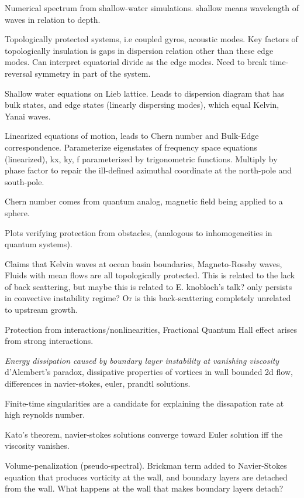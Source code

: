 \begin{description}
{\begin{description}
Numerical spectrum from shallow-water simulations. shallow means wavelength
of waves in relation to depth.

Topologically protected systems, i.e coupled gyros, acoustic modes.
Key factors of topologically insulation is gaps in dispersion relation
other than these edge modes. Can interpret equatorial divide as the edge
modes. Need to break time-reversal symmetry in part of the system.

Shallow water equations on Lieb lattice. Leads to dispersion
diagram that has bulk states, and edge states (linearly dispersing modes),
which equal Kelvin, Yanai waves.

Linearized equations of motion, leads to Chern number and Bulk-Edge correspondence.
Parameterize eigenstates of frequency space equations (linearized), kx, ky, f
parameterized by trigonometric functions. Multiply by phase factor to repair the
ill-defined azimuthal coordinate at the north-pole and south-pole.

Chern number comes from quantum analog, magnetic field being applied to a sphere.

Plots verifying protection from obstacles, (analogous to inhomogeneities in quantum systems).

Claims that Kelvin waves at ocean basin boundaries, Magneto-Rossby waves, Fluids
with mean flows are all topologically protected. This is related to the lack
of back scattering, but maybe this is
related to E. knobloch's talk? only persists in convective instability regime? Or
is this back-scattering completely unrelated to upstream growth.

Protection from interactions/nonlinearities, Fractional Quantum Hall effect arises
from strong interactions.

\item[Marie Farge and Kal Schneider Talk]
\textit{Energy dissipation caused by boundary layer instability at vanishing viscosity}
d'Alembert's paradox, dissipative properties of vortices in wall bounded 2d flow,
differences in navier-stokes, euler, prandtl solutions.

Finite-time singularities are a candidate for explaining the dissapation rate
at high reynolds number.

Kato's theorem, navier-stokes solutions converge toward Euler solution iff
the viscosity vanishes.

Volume-penalization (pseudo-spectral). Brickman term added to Navier-Stokes
equation that produces vorticity at the wall, and boundary layers are
detached from the wall. What happens at the wall that makes boundary
layers detach?


\end{description}}
\end{description}
